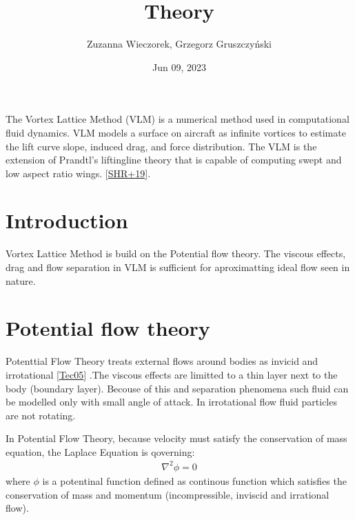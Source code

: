 \documentclass[a4paper,12pt,english]{jupyterBook}
\title{Theory}
\date{Jun 09, 2023}
\author{Zuzanna Wieczorek, Grzegorz Gruszczyński}
\begin{document}
\pagestyle{empty}
\sphinxmaketitle
\clearpage

\pagestyle{plain}
\sphinxtableofcontents
\pagestyle{normal}
\label{\detokenize{chapters/description/theory::doc}}


\sphinxAtStartPar
The Vortex Lattice Method (VLM) is a numerical method used in computational fluid dynamics. VLM models a surface on aircraft as infinite vortices to estimate the lift curve slope, induced drag, and force distribution. The VLM is the extension of Prandtl’s lifting\sphinxhyphen{}line theory that is capable of computing swept and low aspect ratio wings. {[}\hyperlink{cite.chapters/bibliography:id10}{SHR+19}{]}.


\part{Introduction}
\label{\detokenize{chapters/description/theory:introduction}}
\sphinxAtStartPar
Vortex Lattice Method is build on the Potential flow theory. The viscous effects, drag and flow separation in VLM is sufficient for aproximatting ideal flow seen in nature.


\part{Potential flow theory}
\label{\detokenize{chapters/description/theory:potential-flow-theory}}
\sphinxAtStartPar
Potenttial Flow Theory treats external flows around bodies as invicid and irrotational {[}\hyperlink{cite.chapters/bibliography:id6}{Tec05}{]} .The viscous effects are limitted to a thin layer next to the body (boundary layer). Becouse of this and separation phenomena such fluid can be modelled only with small angle of attack. In irrotational flow fluid particles are not rotating.

\sphinxAtStartPar
In Potential Flow Theory, because velocity must satisfy the conservation of mass equation, the Laplace Equation is qoverning:
\begin{equation*}
\begin{split}
\nabla^{2} \phi = 0
\end{split}
\end{equation*}
\sphinxAtStartPar
where \(\phi\) is a potentinal function defined as continous function which satisfies the conservation of mass and momentum (incompressible, inviscid and irrational flow).
\end{document}
